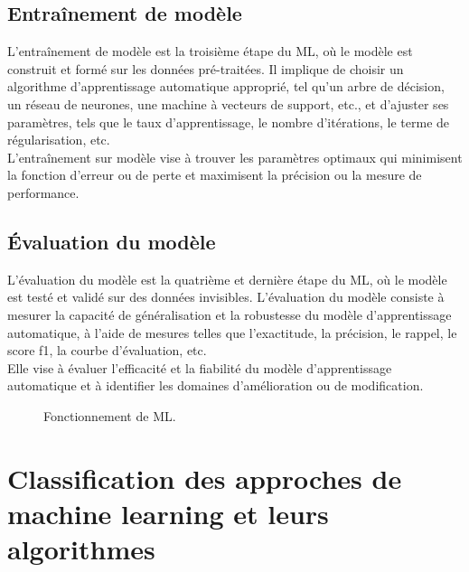 \subsection{Entraînement de modèle}
L'entraînement de modèle est la troisième étape du ML, où le modèle est construit et formé sur les données pré-traitées. Il implique de choisir un algorithme d'apprentissage automatique approprié, tel qu'un arbre de décision, un réseau de neurones, une machine à vecteurs de support, etc., et d'ajuster ses paramètres, tels que le taux d'apprentissage, le nombre d'itérations, le terme de régularisation, etc.\\ 
L'entraînement sur modèle vise à trouver les paramètres optimaux qui minimisent la fonction d’erreur ou de perte et maximisent la précision ou la mesure de performance.

\subsection{Évaluation du modèle}
L'évaluation du modèle est la quatrième et dernière étape du ML, où le modèle est testé et validé sur des données invisibles. L'évaluation du modèle consiste à mesurer la capacité de généralisation et la robustesse du modèle d'apprentissage automatique, à l'aide de mesures telles que l'exactitude, la précision, le rappel, le score f1, la courbe d'évaluation, etc. \\ 
Elle vise à évaluer l'efficacité et la fiabilité du modèle d'apprentissage automatique et à identifier les domaines d'amélioration ou de modification.
\begin{figure}[H]%
    \center%
    \setlength{\fboxsep}{5pt}%
    \setlength{\fboxrule}{0.5pt}%
    \caption{Fonctionnement de ML.}%
\end{figure}

\section{Classification des approches de machine learning et leurs algorithmes}

